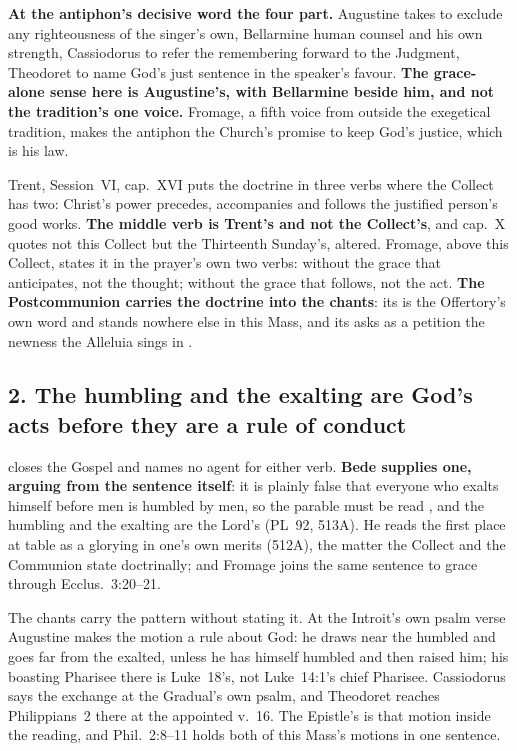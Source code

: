 \textbf{At the antiphon's decisive word the four part.} Augustine takes
 to exclude any righteousness of the singer's own,
Bellarmine human counsel and his own strength, Cassiodorus to refer the
remembering forward to the Judgment, Theodoret to name God's just sentence in
the speaker's favour. \textbf{The grace-alone sense here is Augustine's, with
Bellarmine beside him, and not the tradition's one voice.} Fromage, a fifth
voice from outside the exegetical tradition, makes the antiphon the Church's
promise to keep God's justice, which is his law.

Trent, Session~VI, cap.~XVI puts the doctrine in three verbs where the Collect
has two: Christ's power precedes, accompanies and follows the justified person's
good works. \textbf{The middle verb is Trent's and not the Collect's}, and
cap.~X quotes not this Collect but the Thirteenth Sunday's, altered. Fromage,
above this Collect, states it in the prayer's own two verbs: without the grace
that anticipates, not the thought; without the grace that follows, not the act.
\textbf{The Postcommunion carries the doctrine into the chants}: its
 is the Offertory's own word and stands nowhere else in this
Mass, and its  asks as a petition the newness the Alleluia sings
in .

\subsection*{2. The humbling and the exalting are God's acts before they are a rule of conduct}

closes the Gospel and names no agent for either verb. \textbf{Bede supplies one,
arguing from the sentence itself}: it is plainly false that everyone who exalts
himself before men is humbled by men, so the parable must be read
, and the humbling and the exalting are the Lord's (PL~92, 513A).
He reads the first place at table as a glorying in one's own merits (512A), the
matter the Collect and the Communion state doctrinally; and Fromage joins the
same sentence to grace through Ecclus.~3:20--21.

The chants carry the pattern without stating it. At the Introit's own psalm
verse Augustine makes the motion a rule about God: he draws near the humbled and
goes far from the exalted, unless he has himself humbled and then raised him;
his boasting Pharisee there is Luke~18's, not Luke~14:1's chief Pharisee.
Cassiodorus says the exchange at the Gradual's own psalm, and Theodoret reaches
Philippians~2 there at the appointed v.~16. The Epistle's  is that motion inside the reading, and Phil.~2:8--11 holds both
of this Mass's motions in one sentence.

